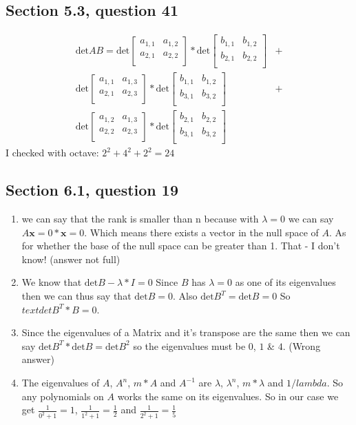 \documentclass[a4paper,11pt]{article}
\newcommand{\mybf}[1]{\boldsymbol{#1}}
\begin{document}
\subsection*{Section 5.3, question 41}
\begin{align*}
\text{det}AB = 
\text{det}
\begin{bmatrix}
a_{1,1} & a_{1,2} \\
a_{2,1} & a_{2,2} \\
\end{bmatrix}
*
\text{det}
\begin{bmatrix}
b_{1,1} & b_{1,2} \\
b_{2,1} & b_{2,2} \\
\end{bmatrix}&+ \\
\text{det}
\begin{bmatrix}
a_{1,1} & a_{1,3} \\
a_{2,1} & a_{2,3} \\
\end{bmatrix}
*
\text{det}
\begin{bmatrix}
b_{1,1} & b_{1,2} \\
b_{3,1} & b_{3,2} \\
\end{bmatrix}&+ \\
\text{det}
\begin{bmatrix}
a_{1,2} & a_{1,3} \\
a_{2,2} & a_{2,3} \\
\end{bmatrix}
*
\text{det}
\begin{bmatrix}
b_{2,1} & b_{2,2} \\
b_{3,1} & b_{3,2} \\
\end{bmatrix}&
\end{align*}
I checked with octave:
$2^2+4^2+2^2=24$
\subsection*{Section 6.1, question 19}
\begin{enumerate}[label=\alph*]
\item we can say that the rank is smaller than n because with $\lambda=0$ we can say $A\mybf{x}=0*\mybf{x}=0$. Which means there exists a vector in the null space of $A$. As for whether the base of the null space can be greater than 1. That - I don't know! (answer not full)
\item We know that $\text{det}B-\lambda*I=0$ Since $B$ has $\lambda=0$ as one of its eigenvalues then we can thus say that $\text{det}B=0$. Also $\text{det}B^T=\text{det}B=0$ So $text{det}B^T*B = 0$.
\item Since the eigenvalues of a Matrix and it's transpose are the same then we can say $\text{det}B^T*\text{det}B=\text{det}B^2$ so the eigenvalues must be $0$, $1$ \& $4$. (Wrong answer)
\item The eigenvalues of $A$, $A^n$, $m*A$ and $A^{-1}$ are $\lambda$, $\lambda^n$, $m*\lambda$ and $1/lambda$. So any polynomials on $A$ works the same on its eigenvalues. So in our case we get $\frac{1}{0^2+1}=1$, $\frac{1}{1^2+1}=\frac{1}{2}$ and $\frac{1}{2^2+1}=\frac{1}{5}$
\end{enumerate}
\end{document}
